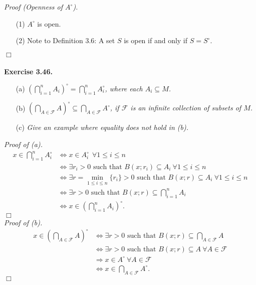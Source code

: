 \documentclass{article}
\begin{document}
\emph{Proof (Openness of $A^{\circ}$).}
\begin{enumerate}
\item[(1)]
$A^{\circ}$ is open.
\item[(2)]
Note to Definition 3.6: A set $S$ is open if and only if $S = S^{\circ}$.
\end{enumerate}
$\Box$ \\\\






\textbf{Exercise 3.46.}
\begin{enumerate}
\item[(a)]
\emph{$\left( \bigcap_{i=1}^{n} A_i \right)^{\circ} = \bigcap_{i=1}^{n} A_i^{\circ}$,
where each $A_i \subseteq M$. }
\item[(b)]
\emph{$\left( \bigcap_{A \in \mathscr{F}} A \right)^{\circ}
\subseteq \bigcap_{A \in \mathscr{F}} A^{\circ}$,
if $\mathscr{F}$ is an infinite collection of subsets of $M$. }
\item[(c)]
\emph{Give an example where equality does not hold in (b). } \\
\end{enumerate}

\emph{Proof of (a).}
\begin{align*}
x \in \bigcap_{i=1}^{n} A_i^{\circ}
&\Longleftrightarrow
x \in A_i^{\circ} \: \: \forall 1 \leq i \leq n \\
&\Longleftrightarrow
\exists r_i > 0 \text{ such that } B(x;r_i) \subseteq A_i \: \forall 1 \leq i \leq n \\
&\Longleftrightarrow
\exists r = \min_{1 \leq i \leq n}\{r_i\} > 0 \text{ such that }
  B(x;r) \subseteq A_i \: \forall 1 \leq i \leq n \\
&\Longleftrightarrow
\exists r > 0 \text{ such that }
  B(x;r) \subseteq \bigcap_{i=1}^{n} A_i \\
&\Longleftrightarrow
x \in \left( \bigcap_{i=1}^{n} A_i \right)^{\circ}.
\end{align*}
$\Box$ \\

\emph{Proof of (b).}
\begin{align*}
x \in \left( \bigcap_{A \in \mathscr{F}} A \right)^{\circ}
&\Longleftrightarrow
\exists r > 0 \text{ such that }
  B(x;r) \subseteq \bigcap_{A \in \mathscr{F}} A \\
&\Longleftrightarrow
\exists r > 0 \text{ such that } B(x;r) \subseteq A \: \forall A \in \mathscr{F} \\
&\Longrightarrow
x \in A^{\circ} \: \forall A \in \mathscr{F} \\
&\Longleftrightarrow
x \in \bigcap_{A \in \mathscr{F}} A^{\circ}.
\end{align*}
$\Box$ \\
\end{document}
